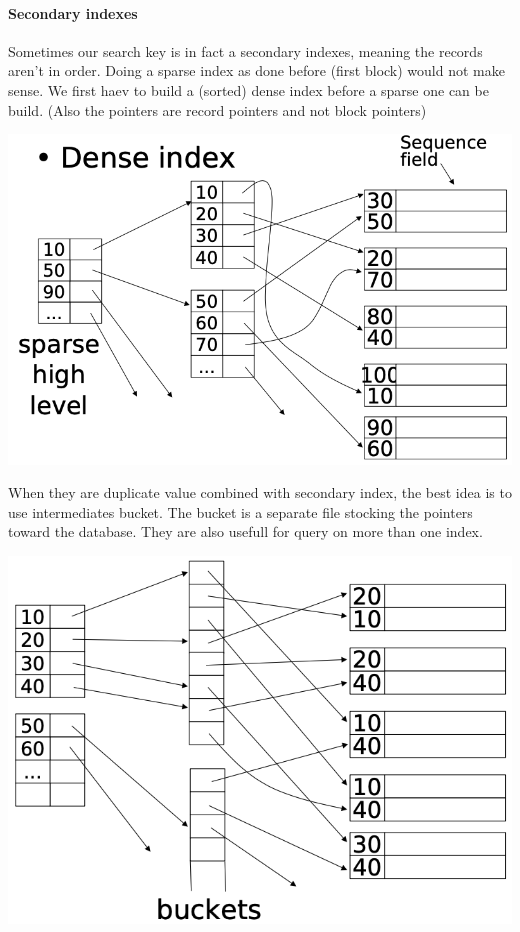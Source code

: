 \documentclass[12pt,a4paper]{article}
\begin{document}
\paragraph{Secondary indexes}
Sometimes our search key is in fact a secondary indexes, meaning the records aren't in order. Doing a sparse index as done before (first block) would not make sense. We first haev to build a (sorted) dense index before a sparse one can be build. (Also the pointers are record pointers and not block pointers)
\begin{center}
\includegraphics[scale=0.3]{img/img33.png}
\end{center}

When they are duplicate value combined with secondary index, the best idea is to use intermediates bucket. The bucket is a separate file stocking the pointers toward the database. They are also usefull for query on more than one index.
\begin{center}
\includegraphics[scale=0.28]{img/img34.png}
\end{center}
\end{document}
